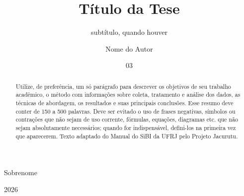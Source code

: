 \documentclass[dsc]{ufrj}
\begin{document}
  \title{Título da Tese}
  \subtitle{subtítulo, quando houver}
  \author{Nome do Autor}{Sobrenome}
  \date{03}{2026}


  \maketitle
  \frontmatter

  \dedication{A quem leu a norma antes de escrever.}


  \begin{abstract}
    Utilize, de preferência, um só parágrafo para descrever os objetivos de
    seu trabalho acadêmico, o método com informações sobre coleta, tratamento
    e análise dos dados, as técnicas de abordagem, os resultados e suas
    principais conclusões. Esse resumo deve conter de 150 a 500 palavras. Deve
    ser evitado o uso de frases negativas, símbolos ou contrações que não
    sejam de uso corrente, fórmulas, equações, diagramas etc. que não sejam
    absolutamente necessários; quando for indispensável, defini-los na
    primeira vez que aparecerem. Texto adaptado do Manual do SiBI da UFRJ pelo
    Projeto Jacurutu.
  \end{abstract}
\end{document}

